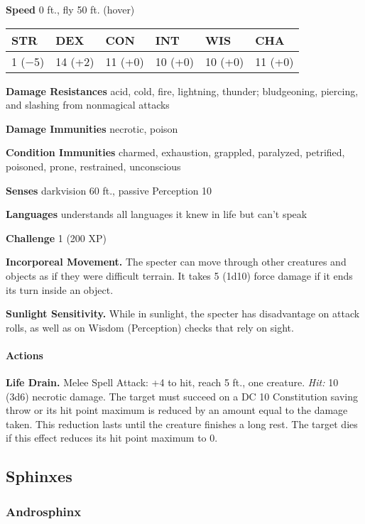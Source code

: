 \documentclass[
]{article}
\begin{document}
\textbf{Speed} 0 ft., fly 50 ft. (hover)

\begin{longtable}[]{@{}llllll@{}}
\toprule
STR & DEX & CON & INT & WIS & CHA\tabularnewline
\midrule
\endhead
1 (−5) & 14 (+2) & 11 (+0) & 10 (+0) & 10 (+0) & 11 (+0)\tabularnewline
\bottomrule
\end{longtable}

\textbf{Damage Resistances} acid, cold, fire, lightning, thunder;
bludgeoning, piercing, and slashing from nonmagical attacks

\textbf{Damage Immunities} necrotic, poison

\textbf{Condition Immunities} charmed, exhaustion, grappled, paralyzed,
petrified, poisoned, prone, restrained, unconscious

\textbf{Senses} darkvision 60 ft., passive Perception 10

\textbf{Languages} understands all languages it knew in life but can't
speak

\textbf{Challenge} 1 (200 XP)

\textbf{Incorporeal Movement.} The specter can move through other
creatures and objects as if they were difficult terrain. It takes 5
(1d10) force damage if it ends its turn inside an object.

\textbf{Sunlight Sensitivity.} While in sunlight, the specter has
disadvantage on attack rolls, as well as on Wisdom (Perception) checks
that rely on sight.

\hypertarget{actions-9}{%
\paragraph{Actions}\label{actions-9}}

\textbf{Life Drain.} Melee Spell Attack: +4 to hit, reach 5 ft., one
creature. \emph{Hit:} 10 (3d6) necrotic damage. The target must succeed
on a DC 10 Constitution saving throw or its hit point maximum is reduced
by an amount equal to the damage taken. This reduction lasts until the
creature finishes a long rest. The target dies if this effect reduces
its hit point maximum to 0.

\hypertarget{sphinxes}{%
\subsection{Sphinxes}\label{sphinxes}}

\hypertarget{androsphinx}{%
\subsubsection{Androsphinx}\label{androsphinx}}
\end{document}
